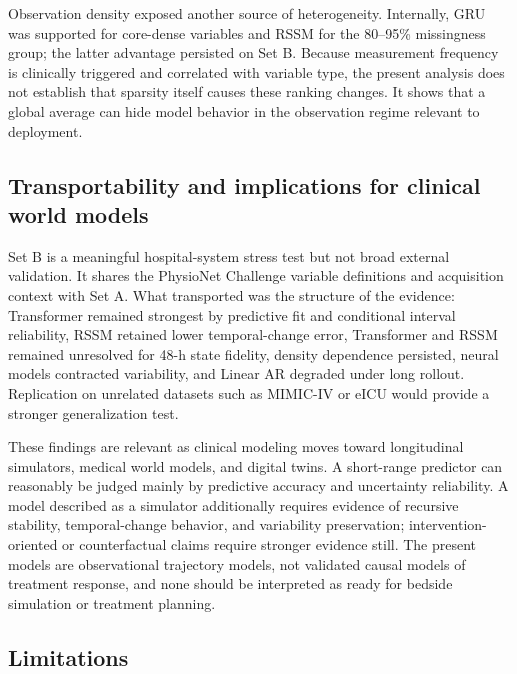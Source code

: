 \documentclass[preprint,12pt]{elsarticle}
\begin{document}
Observation density exposed another source of heterogeneity. Internally, GRU was supported for core-dense variables and RSSM for the 80--95\% missingness group; the latter advantage persisted on Set B. Because measurement frequency is clinically triggered and correlated with variable type, the present analysis does not establish that sparsity itself causes these ranking changes. It shows that a global average can hide model behavior in the observation regime relevant to deployment.

\subsection{Transportability and implications for clinical world models}

Set B is a meaningful hospital-system stress test but not broad external validation. It shares the PhysioNet Challenge variable definitions and acquisition context with Set A. What transported was the structure of the evidence: Transformer remained strongest by predictive fit and conditional interval reliability, RSSM retained lower temporal-change error, Transformer and RSSM remained unresolved for 48-h state fidelity, density dependence persisted, neural models contracted variability, and Linear AR degraded under long rollout. Replication on unrelated datasets such as MIMIC-IV or eICU would provide a stronger generalization test.

These findings are relevant as clinical modeling moves toward longitudinal simulators, medical world models, and digital twins. A short-range predictor can reasonably be judged mainly by predictive accuracy and uncertainty reliability. A model described as a simulator additionally requires evidence of recursive stability, temporal-change behavior, and variability preservation; intervention-oriented or counterfactual claims require stronger evidence still. The present models are observational trajectory models, not validated causal models of treatment response, and none should be interpreted as ready for bedside simulation or treatment planning.

\subsection{Limitations}
\end{document}
